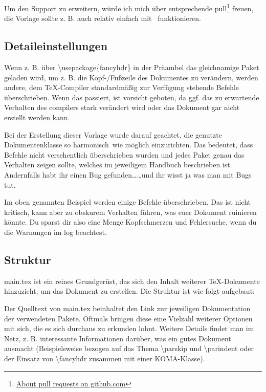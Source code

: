 Um den Support zu erweitern, würde ich mich über entsprechende \gls{pull}\footnote{\href{https://help.github.com/en/articles/about-pull-requests}{About pull requests on github.com}} freuen, die Vorlage sollte z. B. auch relativ einfach mit \ funktionieren.%
\subsection{Detaileinstellungen}%
\label{detail-grundl}
Wenn z. B. über \textbackslash usepackage\{fancyhdr\} in der Präambel das gleichnamige Paket geladen wird, um z. B. die Kopf-/Fußzeile des Dokumentes zu verändern, werden andere, dem \TeX{}-Compiler standardmäßig zur Verfügung stehende Befehle überschrieben. Wenn das passiert, ist vorsicht geboten, da ggf. das zu erwartende Verhalten des \glspl{compiler} stark verändert wird oder das Dokument gar nicht erstellt werden kann.

Bei der Erstellung dieser Vorlage wurde darauf geachtet, die genutzte Dokumentenklasse so \glqq harmonisch\grqq\ wie möglich einzurichten. Das bedeutet, dass Befehle nicht versehentlich überschrieben wurden und jedes Paket genau das Verhalten zeigen sollte, welches im jeweiligem Handbuch beschrieben ist. Andernfalls habt ihr einen Bug gefunden\dots \dots und ihr wisst ja was man mit Bugs tut.

Im oben genannten Beispiel werden einige Befehle überschrieben. Das ist nicht kritisch, kann aber zu obskurem Verhalten führen, was euer Dokument ruinieren könnte. Du sparst dir also eine Menge Kopfschmerzen und Fehlersuche, wenn du die Warnungen im log beachtest.%
\subsection{Struktur}%
\label{sec:struct}
main.tex ist ein reines Grundgerüst, das sich den Inhalt weiterer \TeX{}-Do\-ku\-men\-te hinzuzieht, um das Dokument zu erstellen. Die Struktur ist wie folgt aufgebaut:



Der Quelltext von main.tex beinhaltet den Link zur jeweiligen Dokumentation der verwendeten Pakete. Oftmals bringen diese eine Vielzahl weiterer Optionen mit sich, die es sich durchaus zu erkunden lohnt.
Weitere Details findet man im Netz, z. B. interessante Informationen darüber, was ein gutes Dokument ausmacht (Beispielsweise bezogen auf das Thema \textbackslash parskip und \textbackslash parindent oder der Einsatz von \textbackslash fancyhdr zusammen mit einer KOMA-Klasse).%
